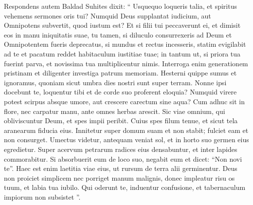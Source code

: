 \begin{biblechapter}
\begin{biblechapter}
\begin{biblechapter}
\begin{biblechapter}
\begin{biblechapter}
\begin{biblechapter}
\begin{biblechapter}
\begin{biblechapter}
\verse Respondens autem Baldad Suhites dixit:
 \verse “ Usquequo loqueris talia,
 et spiritus vehemens sermones oris tui?
 \verse Numquid Deus supplantat iudicium,
 aut Omnipotens subvertit, quod iustum est?
 \verse Et si filii tui peccaverunt ei,
 et dimisit eos in manu iniquitatis suae,
 \verse tu tamen, si diluculo consurrexeris ad Deum
 et Omnipotentem fueris deprecatus, 
\verse si mundus et rectus incesseris,
 statim evigilabit ad te
 et pacatum reddet habitaculum iustitiae tuae;
 \verse in tantum ut, si priora tua fuerint parva,
 et novissima tua multiplicentur nimis.
 \verse Interroga enim generationem pristinam
 et diligenter investiga patrum memoriam.
 \verse Hesterni quippe sumus et ignoramus,
 quoniam sicut umbra dies nostri sunt super terram.
 \verse Nonne ipsi docebunt te, loquentur tibi
 et de corde suo proferent eloquia?
 \verse Numquid virere potest scirpus absque umore,
 aut crescere carectum sine aqua?
 \verse Cum adhuc sit in flore, nec carpatur manu,
 ante omnes herbas arescit.
 \verse Sic viae omnium, qui obliviscuntur Deum,
 et spes impii peribit.
 \verse Cuius spes filum tenue,
 et sicut tela aranearum fiducia eius. 
\verse Innitetur super domum suam et non stabit;
 fulciet eam et non consurget.
 \verse Umectus videtur, antequam veniat sol,
 et in horto suo germen eius egredietur.
 \verse Super acervum petrarum radices eius densabuntur,
 et inter lapides commorabitur.
 \verse Si absorbuerit eum de loco suo,
 negabit eum et dicet: “Non novi te”.
 \verse Haec est enim laetitia viae eius,
 ut rursum de terra alii germinentur. 
\verse Deus non proiciet simplicem
 nec porriget manum malignis,
 \verse donec impleatur risu os tuum,
 et labia tua iubilo.
 \verse Qui oderunt te, induentur confusione,
 et tabernaculum impiorum non subsistet ”.
 

\end{biblechapter}
\end{biblechapter}
\end{biblechapter}
\end{biblechapter}
\end{biblechapter}
\end{biblechapter}
\end{biblechapter}
\end{biblechapter}

